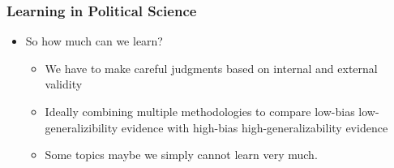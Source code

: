 \documentclass[xcolor=x11names,compress]{beamer}\usepackage[]{graphicx}\usepackage[]{xcolor}
\renewcommand{\(}{\begin{columns}}
\renewcommand{\)}{\end{columns}}
\newcommand{\<}[1]{\begin{column}{#1}}
\renewcommand{\>}{\end{column}}
\begin{document}
\begin{frame}
\frametitle{Learning in Political Science}
\begin{itemize}
\item So how much can we learn?
\pause
\begin{itemize}
\item We have to make careful judgments based on internal and external validity
\pause
\item Ideally combining multiple methodologies to compare low-bias low-generalizibility evidence with high-bias high-generalizability evidence
\pause
\item Some topics maybe we simply cannot learn very much.
\end{itemize}
\end{itemize}
\end{frame} 
\end{document}
